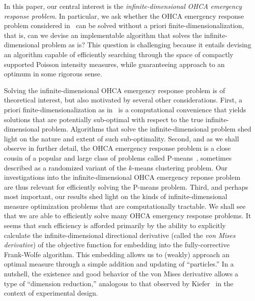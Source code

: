 \documentclass[stsy,sglanonrev]{informs4}
\begin{document}
In this paper, our central interest is the \emph{infinite-dimensional OHCA emergency response problem}. In particular, we ask whether the OHCA emergency response problem considered in~\cite{van2024modeling} can be solved without a priori finite-dimensionalization, that is, can we devise an implementable algorithm that solves the infinite-dimensional problem as is? This question is challenging because it entails devising an algorithm capable of efficiently searching through the space of compactly supported Poisson intensity measures, while guaranteeing approach to an optimum in some rigorous sense. 

Solving the infinite-dimensional OHCA emergency response problem is of theoretical interest, but also motivated by several other considerations. First, a priori finite-dimensionalization as in~\cite{van2024modeling} is a computational convenience that yields solutions that are potentially sub-optimal with respect to the true infinite-dimensional problem. Algorithms that solve the infinite-dimensional problem shed light on the nature and extent of such sub-optimality. Second, and as we shall observe in further detail, the OHCA emergency response problem is a close cousin of a popular and large class of problems called P-means~\cite{2002molzuy,2000oka}, sometimes described as a randomized variant of the $k$-means clustering problem. Our investigations into the infinite-dimensional OHCA emergency reponse problem are thus relevant for efficiently solving the P-means problem. Third, and perhaps most important, our results shed light on the kinds of infinite-dimensional measure optimization problems that are computationally tractable. We shall see that we are able to efficiently solve many OHCA emergency response problems. It seems that such efficiency is afforded primarily by the ability to explicitly calculate the infinite-dimensional directional derivative (called the \emph{von Mises derivative}) of the objective function for embedding into the fully-corrective Frank-Wolfe algorithm. This embedding allows us to (weakly) approach an optimal measure through a simple addition and updating of ``particles.'' In a nutshell, the existence and good behavior of the von Mises derivative allows a type of ``dimension reduction,'' analogous to that observed by Kiefer~\cite{1974kie} in the context of experimental design.

\end{document}
